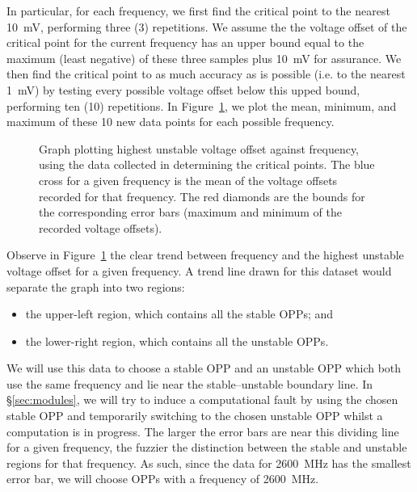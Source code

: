 In particular, for each frequency, we first find the critical point to the
nearest 10~mV, performing three (3) repetitions. We assume the the voltage
offset of the critical point for the current frequency has an upper bound equal
to the maximum (least negative) of these three samples plus 10~mV for assurance.
We then find the critical point to as much accuracy as is possible (i.e. to the 
nearest 1~mV) by testing every possible voltage offset below this upped bound,
performing ten (10) repetitions. In Figure~\ref{fig:critical-points-graph}, we
plot the mean, minimum, and maximum of these 10 new data points for each
possible frequency.

\begin{figure}[!htb]
    \caption{
        \label{fig:critical-points-graph}
        Graph plotting highest unstable voltage offset against frequency, using
        the data collected in determining the critical points. The blue cross
        for a given frequency is the mean of the voltage offsets recorded for
        that frequency. The red diamonds are the bounds for the corresponding
        error bars (maximum and minimum of the recorded voltage offsets).
    }
\end{figure}

Observe in Figure~\ref{fig:critical-points-graph} the clear trend between
frequency and the highest unstable voltage offset for a given frequency.
A trend line drawn for this dataset would separate the graph into two regions:

\begin{itemize}
    \item the upper-left region, which contains all the stable OPPs; and
    \item the lower-right region, which contains all the unstable OPPs.
\end{itemize}

We will use this data to choose a stable OPP and an unstable OPP which both use
the same frequency and lie near the stable–unstable boundary line. In
§\ref{sec:modules}, we will try to induce a computational fault by using the
chosen stable OPP and temporarily switching to the chosen unstable OPP whilst a
computation is in progress. The larger the error bars are near this dividing
line for a given frequency, the fuzzier the distinction between the stable and
unstable regions for that frequency. As such, since the data for 2600~MHz has
the smallest error bar, we will choose OPPs with a frequency of 2600~MHz.
